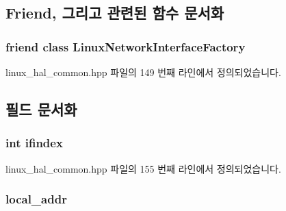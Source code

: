 \subsection{Friend, 그리고 관련된 함수 문서화}
\subsubsection[{\texorpdfstring{Linux\+Network\+Interface\+Factory}{LinuxNetworkInterfaceFactory}}]{\setlength{\rightskip}{0pt plus 5cm}friend class {\bf Linux\+Network\+Interface\+Factory}\hspace{0.3cm}{\ttfamily [friend]}}\hypertarget{class_linux_network_interface_af1d8dc20f87a29eb0af128366c47a247}{}\label{class_linux_network_interface_af1d8dc20f87a29eb0af128366c47a247}


linux\+\_\+hal\+\_\+common.\+hpp 파일의 149 번째 라인에서 정의되었습니다.



\subsection{필드 문서화}
\subsubsection[{\texorpdfstring{ifindex}{ifindex}}]{\setlength{\rightskip}{0pt plus 5cm}int ifindex\hspace{0.3cm}{\ttfamily [private]}}\hypertarget{class_linux_network_interface_a01e636f8746c84f1cf3d45c4afbfde35}{}\label{class_linux_network_interface_a01e636f8746c84f1cf3d45c4afbfde35}


linux\+\_\+hal\+\_\+common.\+hpp 파일의 155 번째 라인에서 정의되었습니다.

\subsubsection[{\texorpdfstring{local\+\_\+addr}{local_addr}}]{ local\+\_\+addr\hspace{0.3cm}{\ttfamily [private]}}\hypertarget{class_linux_network_interface_af3d1546f688fbb9cec0317d152cab1da}{}\label{class_linux_network_interface_af3d1546f688fbb9cec0317d152cab1da}


